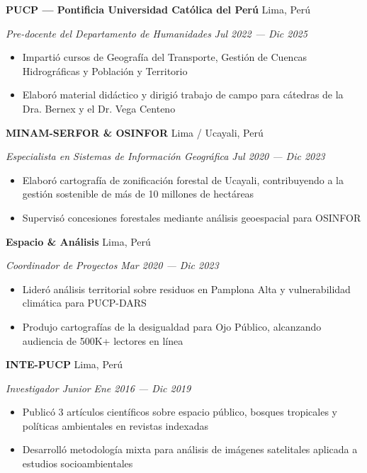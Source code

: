 \documentclass[11pt,letterpaper]{article}
\newcommand{\entry}[4]{%
  \noindent\textbf{#1} \hfill #2 \par\nopagebreak
  \textit{#3} \hfill \textit{#4} \par\nopagebreak
}
\begin{document}
\entry{PUCP --- Pontificia Universidad Cat\'olica del Per\'u}{Lima, Per\'u}{Pre-docente del Departamento de Humanidades}{Jul 2022 --- Dic 2025}
\begin{itemize}
  \item Imparti\'o cursos de Geograf\'ia del Transporte, Gesti\'on de Cuencas Hidrogr\'aficas y Poblaci\'on y Territorio
  \item Elabor\'o material did\'actico y dirigi\'o trabajo de campo para c\'atedras de la Dra. Bernex y el Dr. Vega Centeno
\end{itemize}
\vspace{0.3em}

\entry{MINAM-SERFOR \& OSINFOR}{Lima / Ucayali, Per\'u}{Especialista en Sistemas de Informaci\'on Geogr\'afica}{Jul 2020 --- Dic 2023}
\begin{itemize}
  \item Elabor\'o cartograf\'ia de zonificaci\'on forestal de Ucayali, contribuyendo a la gesti\'on sostenible de m\'as de 10 millones de hect\'areas
  \item Supervis\'o concesiones forestales mediante an\'alisis geoespacial para OSINFOR
\end{itemize}
\vspace{0.3em}

\entry{Espacio \& An\'alisis}{Lima, Per\'u}{Coordinador de Proyectos}{Mar 2020 --- Dic 2023}
\begin{itemize}
  \item Lider\'o an\'alisis territorial sobre residuos en Pamplona Alta y vulnerabilidad clim\'atica para PUCP-DARS
  \item Produjo cartograf\'ias de la desigualdad para Ojo P\'ublico, alcanzando audiencia de 500K+ lectores en l\'inea
\end{itemize}
\vspace{0.3em}

\entry{INTE-PUCP}{Lima, Per\'u}{Investigador Junior}{Ene 2016 --- Dic 2019}
\begin{itemize}
  \item Public\'o 3 art\'iculos cient\'ificos sobre espacio p\'ublico, bosques tropicales y pol\'iticas ambientales en revistas indexadas
  \item Desarroll\'o metodolog\'ia mixta para an\'alisis de im\'agenes satelitales aplicada a estudios socioambientales
\end{itemize}
\vspace{0.3em}

\end{document}
